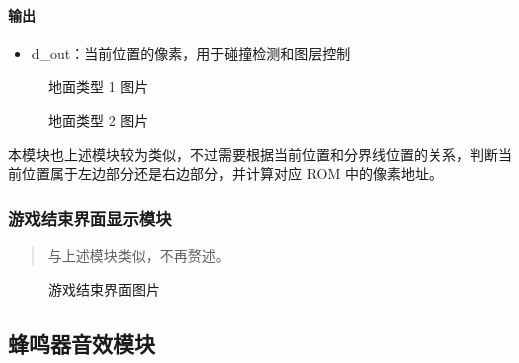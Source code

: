 \documentclass[hyperref,UTF8,12pt,a4paper]{ctexart}
\providecommand{\tightlist}{%
  \setlength{\itemsep}{0pt}\setlength{\parskip}{0pt}}
\begin{document}
\hypertarget{ux8f93ux51fa-6}{%
\paragraph{输出}\label{ux8f93ux51fa-6}}

\begin{itemize}
\tightlist
\item
  d\_out：当前位置的像素，用于碰撞检测和图层控制
\end{itemize}

\begin{figure}[H]
\centering
{}
\caption{地面类型 1 图片}
\end{figure}

\begin{figure}[H]
\centering
{}
\caption{地面类型 2 图片}
\end{figure}

本模块也上述模块较为类似，不过需要根据当前位置和分界线位置的关系，判断当前位置属于左边部分还是右边部分，并计算对应
ROM 中的像素地址。

\hypertarget{ux6e38ux620fux7ed3ux675fux754cux9762ux663eux793aux6a21ux5757}{%
\subsubsection{游戏结束界面显示模块}\label{ux6e38ux620fux7ed3ux675fux754cux9762ux663eux793aux6a21ux5757}}

\begin{quote}
与上述模块类似，不再赘述。
\end{quote}

\begin{figure}[H]
\centering
{}
\caption{游戏结束界面图片}
\end{figure}

\hypertarget{ux8702ux9e23ux5668ux97f3ux6548ux6a21ux5757}{%
\subsection{蜂鸣器音效模块}\label{ux8702ux9e23ux5668ux97f3ux6548ux6a21ux5757}}
\end{document}
